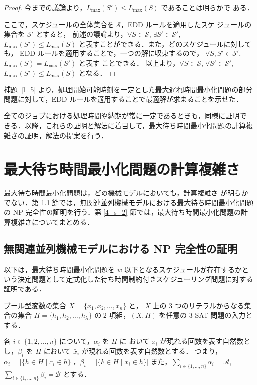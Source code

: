 \documentclass[12pt]{optlab-bachelor}
\begin{document}
\begin{proof}
  今までの議論より，$L_{\max}(S') \le L_{\max}(S)$ であることは明らかで
  ある．

  ここで，スケジュールの全体集合を $\mathcal{S}$，EDD ルールを適用したスケ
  ジュールの集合を $\mathcal{S}'$ とすると，
  前述の議論より，$\forall S \in \mathcal{S}$, $\exists S' \in \mathcal{S}'$, $L_{\max}(S') \le L_{\max}(S)$ と表すことができる．また，どのスケジュールに対しても，
  EDD ルールを適用することで，一つの解に収束するので，
  $\forall S, S' \in \mathcal{S}'$, $L_{\max}(S) = L_{\max}(S')$ と表す
  ことできる．
  以上より，$\forall S \in \mathcal{S}$, $\forall
  S' \in \mathcal{S}'$, $L_{\max}(S') \le L_{\max}(S)$ となる．
\end{proof}

補題~\ref{l_5} より，処理開始可能時刻を一定とした最大遅れ時間最小化問題の部分問題に対して，EDD ルールを適用することで最適解が求まることを示せた．

全てのジョブにおける処理時間や納期が常に一定であるときも，同様に証明で
きる．以降，これらの証明と解法に着目して，最大待ち時間最小化問題の計算複雑さの証明，解法の提案を行う．

\chapter{最大待ち時間最小化問題の計算複雑さ}\label{c_4}
最大待ち時間最小化問題は，どの機械モデルにおいても，計算複雑さ
が明らかでない．第 \ref{4_s_1} 節では，無関連並列機械モデルにおける最大待ち時間最小化問題の NP 完全性の証明を行う．第 \ref{4_s_2} 節では，最大待ち時間最小化問題の計算複雑さについてまとめる．

\section{無関連並列機械モデルにおける NP 完全性の証明}\label{4_s_1}
以下は，最大待ち時間最小化問題を $w$ 以下となるスケジュールが存在するかという決定問題として定式化した待ち時間制約付きスケジューリング問題に対する証明である．

ブール型変数の集合 $X =\{x_1, x_2,\ldots ,x_n\}$ と， $X$ 上の 3 つのリテラルからなる集合の集合 $H =\{h_1, h_2,\ldots ,h_{\lambda}\}$ の 2 項組，$(X,H)$ を任意の \textsc{3-SAT} 問題の入力とする．

各 $i \in \{1,2,\ldots, n\}$ について，$\alpha_i$ を $H$ に おいて $x_i$ が現れる回数を表す自然数とし，$\beta_i$ を $H$ において $\bar x_i$ が現れる回数を表す自然数とする．
つまり，$\alpha_i = \big|\{h \in H \mid x_i \in h\}\big|$，$\beta_i = \big|\{h \in H \mid \bar x_i \in h\}\big|$
また，$\displaystyle \sum_{i \in \{1,\ldots,n\}} \alpha_i = \mathcal{A}$, $\displaystyle \sum_{i \in \{1,\ldots,n\}} \beta_i = \mathcal{B}$  とする．
\end{document}
